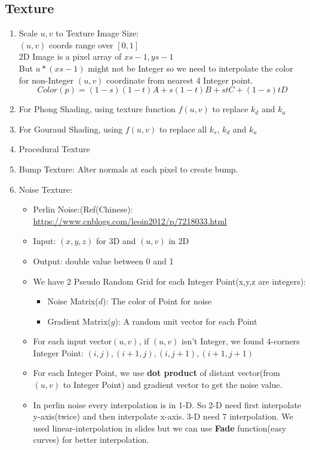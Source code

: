 \documentclass[geye,cyan,normal,en]{elegantnote}
\begin{document}
\subsection{Texture}
\begin{enumerate}
	\item Scale $u,v$ to Texture Image Size:\\
	$(u,v)$ coords range over $[0,1]$\\
	2D Image is a pixel array of $xs-1,ys-1$\\
	But $u*(xs-1)$ might not be Integer so we need to interpolate the color for non-Integer $(u,v)$ coordinate from nearest 4 Integer point.
	$$Color(p)=(1-s)(1-t)A+s(1-t)B+stC+(1-s)tD$$
	\item For Phong Shading, using texture function $f(u,v)$ to replace $k_d$ and $k_a$
	\item For Gouraud Shading, using $f(u,v)$ to replace all $k_s$, $k_d$ and $k_a$
	\item Procedural Texture
	\item Bump Texture: Alter normals at each pixel to create bump.
	\item Noise Texture:
	\begin{itemize}
		\item Perlin Noise:(Ref(Chinese): \href{https://www.cnblogs.com/leoin2012/p/7218033.html}{https://www.cnblogs.com/leoin2012/p/7218033.html}
		\item Input: $(x,y,z)$ for 3D and $(u,v)$ in 2D
		\item Output: double value between 0 and 1
		\item We have 2 Pseudo Random Grid for each Integer Point(x,y,z are integers):
		\begin{itemize}
			\item Noise Matrix($d$): The color of Point for noise
			\item Gradient Matrix($g$): A random unit vector for each Point
		\end{itemize}
		\item For each input vector$(u,v)$, if $(u,v)$ isn't Integer, we found 4-corners Integer Point: $(i,j),(i+1,j),(i,j+1),(i+1,j+1)$
		\item For each Integer Point, we use \textbf{dot product} of distant vector(from $(u,v)$ to Integer Point) and gradient vector to get the noise value.
		\item In perlin noise every interpolation is in 1-D. So 2-D need first interpolate y-axis(twice) and then interpolate x-axis. 3-D need 7 interpolation.
		We used linear-interpolation in slides but we can use \textbf{Fade} function(easy curves) for better interpolation.

\end{itemize}
\end{enumerate}
\end{document}
